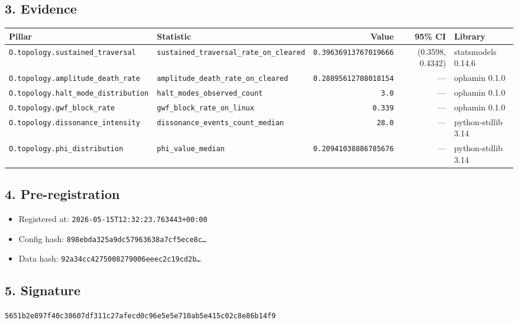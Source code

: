 \documentclass{article}
\begin{document}
\subsection*{3. Evidence}
\begin{tabular}{llrrl}\toprule
\textbf{Pillar} & \textbf{Statistic} & \textbf{Value} & \textbf{95\% CI} & \textbf{Library} \\\midrule
\texttt{O.topology.sustained\_traversal} & \texttt{sustained\_traversal\_rate\_on\_cleared} & \texttt{0.39636913767019666} & (0.3598, 0.4342) & statsmodels 0.14.6 \\
\texttt{O.topology.amplitude\_death\_rate} & \texttt{amplitude\_death\_rate\_on\_cleared} & \texttt{0.28895612708018154} & --- & ophamin 0.1.0 \\
\texttt{O.topology.halt\_mode\_distribution} & \texttt{halt\_modes\_observed\_count} & \texttt{3.0} & --- & ophamin 0.1.0 \\
\texttt{O.topology.gwf\_block\_rate} & \texttt{gwf\_block\_rate\_on\_linux} & \texttt{0.339} & --- & ophamin 0.1.0 \\
\texttt{O.topology.dissonance\_intensity} & \texttt{dissonance\_events\_count\_median} & \texttt{28.0} & --- & python-stdlib 3.14 \\
\texttt{O.topology.phi\_distribution} & \texttt{phi\_value\_median} & \texttt{0.20941038886785676} & --- & python-stdlib 3.14 \\
\bottomrule\end{tabular}
\subsection*{4. Pre-registration}
\begin{itemize}
\item Registered at: \texttt{2026-05-15T12:32:23.763443+00:00}
\item Config hash: \texttt{898ebda325a9dc57963638a7cf5ece8c\dots}
\item Data hash: \texttt{92a34cc4275008279006eeec2c19cd2b\dots}
\end{itemize}
\subsection*{5. Signature}
\texttt{5651b2e897f40c38607df311c27afecd0c96e5e5e710ab5e415c02c8e86b14f9}\\
\end{document}
